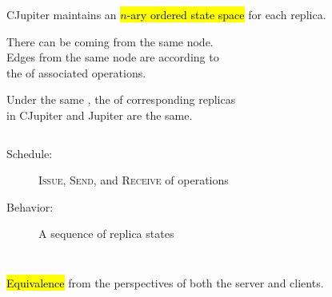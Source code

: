 
\begin{frame}{}
  \centerline{\Huge {}}
\end{frame}

\begin{frame}{}
  \begin{center}
    {\large CJupiter maintains an \hl{$n$-ary ordered state space} for each replica.}
  \end{center}


  \begin{center} 
    There can be  coming from the same node. \\[5pt] \pause
    Edges from the same node are  according to \\[2pt] 
    the  of associated operations.
  \end{center}
\end{frame}

\begin{frame}{}
  \begin{Theorem}
    Under the same , the  of corresponding replicas \\ in CJupiter and Jupiter are the same.
  \end{Theorem}

  \vspace{0.80cm}
  \begin{columns}
      \begin{description}
	\item[Schedule:] \textsc{Issue}, \textsc{Send}, and \textsc{Receive} of operations
	\item[Behavior:] A sequence of replica states
      \end{description}
  \end{columns}

  \pause
  \vspace{0.50cm}
  \begin{center}
    {\large \hl{Equivalence} from the perspectives of both the server and clients.}
  \end{center}
\end{frame}

